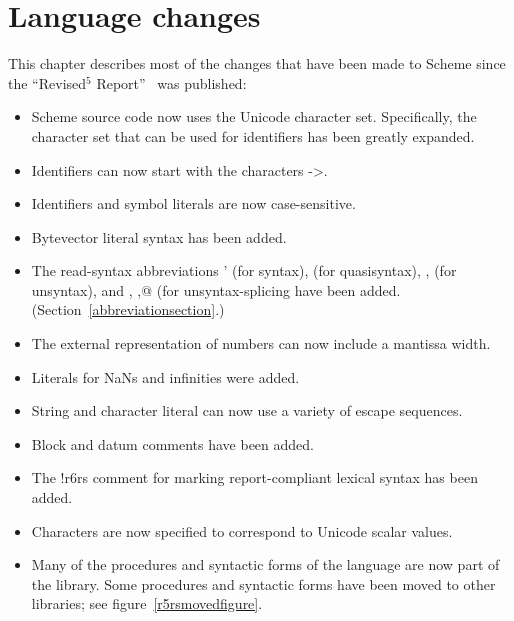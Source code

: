 \chapter{Language changes}

This chapter describes most of the changes that have been made to
Scheme since the ``Revised$^5$ Report''~\cite{R5RS} was published:

\begin{itemize}
\item Scheme source code now uses the Unicode character set.
  Specifically, the character set that can be used for identifiers has
  been greatly expanded.
\item Identifiers can now start with the characters {\cf ->}.
\item Identifiers and symbol literals are now case-sensitive.
\item Bytevector literal syntax has been added.
\item The read-syntax abbreviations {\cf \sharpsign{}'} (for {\cf
    syntax}), {\cf \sharpsign\backquote} (for {\cf quasisyntax}), {\cf
    \sharpsign{},} (for {\cf unsyntax}), and , {\cf \sharpsign{},@}
  (for {\cf unsyntax-splicing} have been added.  (Section~\ref{abbreviationsection}.)
\item The external representation of numbers can now include a
  mantissa width.
\item Literals for NaNs and infinities were added.
\item String and character literal can now use a variety of escape sequences.
\item Block and datum comments have been added.
\item The {\cf !\sharpsign{}r6rs} comment for marking report-compliant
  lexical syntax has been added.
\item Characters are now specified to correspond to Unicode scalar
  values.
\item Many of the procedures and syntactic forms of the language are
  now part of the  library.  Some procedures and
  syntactic forms have been moved to other libraries; see figure~\ref{r5rsmovedfigure}.


\end{itemize}
